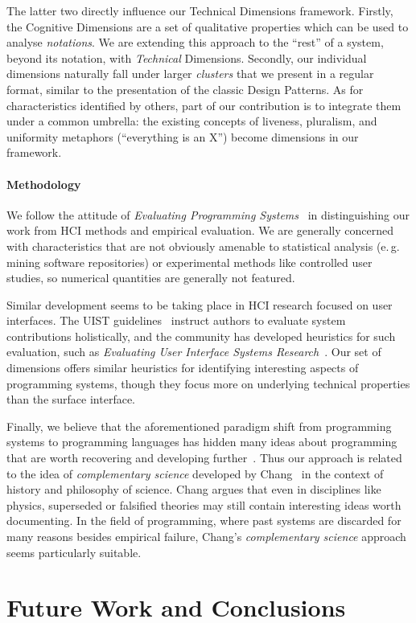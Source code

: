 \documentclass[ twoside,openright,titlepage,numbers=noenddot,headinclude,footinclude,cleardoublepage=empty,abstract=on,
                BCOR=5mm,paper=a4,fontsize=11pt
                ]{scrreprt}
\newcommand{\eg}{e.\,g.}
\theoremstyle{definition}
\begin{document}
The latter two directly influence our Technical Dimensions framework.
Firstly, the Cognitive Dimensions are a set of qualitative properties
which can be used to analyse \emph{notations}. We are extending this
approach to the ``rest'' of a system, beyond its notation, with
\emph{Technical} Dimensions. Secondly, our individual dimensions
naturally fall under larger \emph{clusters} that we present in a regular
format, similar to the presentation of the classic Design Patterns. As
for characteristics identified by others, part of our contribution is to
integrate them under a common umbrella: the existing concepts of
liveness, pluralism, and uniformity metaphors (``everything is an X'')
become dimensions in our framework.

\hypertarget{methodology}{\subsubsection{Methodology}\label{methodology}}

We follow the attitude of \emph{Evaluating Programming
Systems}~\parencite{EvProgSys} in distinguishing our work from HCI
methods and empirical evaluation. We are generally concerned with
characteristics that are not obviously amenable to statistical analysis
(\eg{} mining software repositories) or experimental methods like
controlled user studies, so numerical quantities are generally not
featured.

Similar development seems to be taking place in HCI research focused on
user interfaces. The UIST guidelines~\parencite{UISTAuthor} instruct
authors to evaluate system contributions holistically, and the community
has developed heuristics for such evaluation, such as \emph{Evaluating
User Interface Systems Research}~\parencite{EvUISR}. Our set of
dimensions offers similar heuristics for identifying interesting aspects
of programming systems, though they focus more on underlying technical
properties than the surface interface.

Finally, we believe that the aforementioned paradigm shift from
programming systems to programming languages has hidden many ideas about
programming that are worth recovering and developing
further~\parencite{ComplementaryBasic}. Thus our approach is related to
the idea of \emph{complementary science} developed by
Chang~\parencite{Chang} in the context of history and philosophy of
science. Chang argues that even in disciplines like physics, superseded
or falsified theories may still contain interesting ideas worth
documenting. In the field of programming, where past systems are
discarded for many reasons besides empirical failure, Chang's
\emph{complementary science} approach seems particularly suitable.
\clearpage{}
\cleardoublepage
\clearpage{}\hypertarget{future-work-and-conclusions}{\chapter{Future Work and Conclusions}\label{future-work-and-conclusions}}
\end{document}
